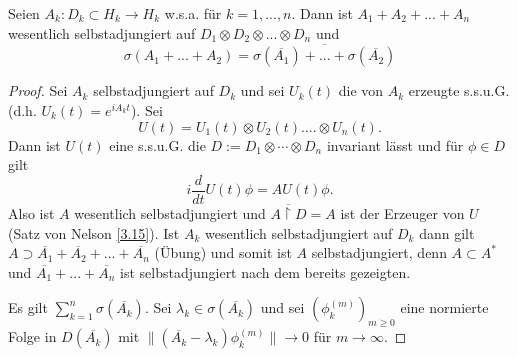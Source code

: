 \documentclass{mycourse}
\begin{document}
\begin{st}
Seien $A_k: D_k \subset H_k \to H_k$ w.s.a. für $k=1,...,n$. Dann ist $A_1 + A_2 + ... +A_n$ wesentlich selbstadjungiert  auf $D_1 \otimes D_2 \otimes ... \otimes D_n$ und
\[
\sigma(A_1+... + A_2) = \overline{\sigma(\overline{A_1}) + ... + \sigma(\overline{A_2})}
\]
\end{st}
\begin{proof}
Sei $A_k$ selbstadjungiert auf $D_k$ und sei $U_k(t)$ die von $A_k$ erzeugte s.s.u.G. (d.h. $U_k(t) = e^{iA_k t}$). Sei
\[
U(t) = U_1(t) \otimes U_2(t) .... \otimes U_n(t).
\]
Dann ist $U(t)$ eine s.s.u.G. die $D:= D_1 \otimes \cdots \otimes D_n$ invariant lässt und für $\phi \in D$ gilt
\[
i \frac{d}{dt} U(t) \phi = AU(t) \phi.
\]
Also ist $A$ wesentlich selbstadjungiert und $\overline{A\upharpoonright D} = A$ ist der Erzeuger von $U$ (Satz von Nelson \ref{3.15}). Ist $A_k$ wesentlich selbstadjungiert auf $D_k$ dann gilt $A\supset \overline{A_1} + \overline{A_2} + ... + \overline{A_n}$ (Übung) und somit ist $A$ selbstadjungiert, denn $A\subset A^*$ und $\overline{A_1} +...+\overline{A_n}$ ist selbstadjungiert nach dem bereits gezeigten.

Es gilt $\sum_{k=1}^n \sigma(\overline{A_k})$.
Sei $\lambda_k \in \sigma(\overline{A_k})$ und sei $(\phi_k^{(m)})_{m\ge 0}$ eine normierte Folge in $D(\overline{A_k})$ mit $\| (\overline{A_k} -\lambda_k) \phi_k^{(m)}\| \to 0$ für $m\to \infty$.


\end{proof}
\end{document}
